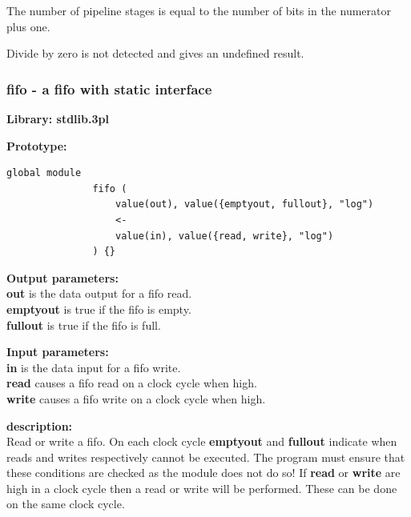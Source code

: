             The number of pipeline stages is equal to the number of bits in the
            numerator plus one.

            Divide by zero is not detected and gives an undefined result.





        \subsubsection{fifo - a fifo with static interface}\label{sec:lmfifo}

            {\bf Library: stdlib.3pl}

            {\bf Prototype:} \\
            \vsp
            \begin{lstlisting}[gobble=12, language=threepl]
               global module
               fifo (
                   value(out), value({emptyout, fullout}, "log")
                   <-
                   value(in), value({read, write}, "log")
               ) {}
            \end{lstlisting}

            {\bf Output parameters:} \\
            {\bf out} is the data output for a fifo read.\\
            {\bf emptyout} is true if the fifo is empty.\\
            {\bf fullout} is true if the fifo is full.

            {\bf Input parameters:} \\
            {\bf in} is the data input for a fifo write.\\
            {\bf read} causes a fifo read on a clock cycle when high.\\
            {\bf write} causes a fifo write on a clock cycle when high.

            {\bf description:} \\
            Read or write a fifo. On each clock cycle {\bf emptyout} and {\bf
            fullout} indicate when reads and writes respectively cannot be
            executed. The program must ensure that these conditions are
            checked as the module does not do so! If {\bf read} or {\bf
            write} are high in a clock cycle then a read or write will be
            performed. These can be done on the same clock cycle.





